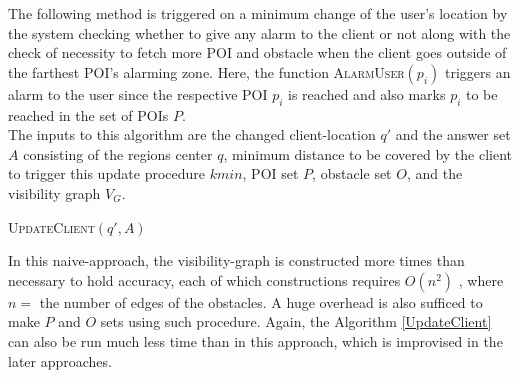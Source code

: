 \documentclass{sig-alternate}
\begin{document}
The following method is triggered on a minimum change of the user's location by the system checking whether to give any alarm to the client or not along with the check of necessity to fetch more POI and obstacle when the client goes outside of the farthest POI's alarming zone.
Here, the function \textsc{AlarmUser}$(p_i)$ triggers an alarm to the user since the respective POI $p_i$ is reached and also marks $p_i$ to be reached in the set of POIs $P$. \\
The inputs to this algorithm are the changed client-location $q'$ and the answer set $A$ consisting of the regions center $q$, minimum distance to be covered by the client to trigger this update procedure $k{min}$, POI set $P$, obstacle set $O$, and the visibility graph $V_G$.
 
\begin{algorithm}
\caption{\textsc{UpdateClient}$(q', A)$}

    
\label{UpdateClient}
\end{algorithm}


In this naive-approach, the visibility-graph is constructed more times than necessary to hold accuracy, each of which constructions requires $O(n^2)$ \cite{mur}, where $n =$ the number of edges of the obstacles. A huge overhead is also sufficed to make $P$ and $O$ sets using such procedure. Again, the Algorithm \ref{UpdateClient} can also be run much less time than in this approach, which is improvised in the later approaches.
\end{document}

